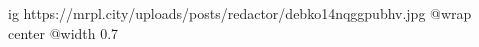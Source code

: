  
 
 
 
 

\ifcmt
  ig https://mrpl.city/uploads/posts/redactor/debko14nqggpubhv.jpg
  @wrap center
  @width 0.7
\fi

